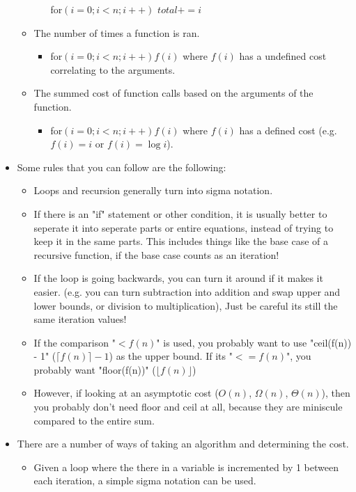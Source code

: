 \documentclass{article}
\begin{document}
\begin{itemize}
\begin{itemize}
\begin{itemize}
                    for$(i = 0; i < n; i++)$ $total += i$
                \end{itemize}
            \item The number of times a function is ran.
                \begin{itemize}
                    \item for$(i = 0; i < n; i++) f(i)$ where $f(i)$ has a undefined cost correlating to the arguments.
                \end{itemize}
            \item The summed cost of function calls based on the arguments of the function.
                \begin{itemize}
                    \item for$(i = 0; i < n; i++) f(i)$ where $f(i)$ has a defined cost (e.g. $f(i) = i$ or $f(i) = \log i$).
                \end{itemize}
		\end{itemize}
	\item Some rules that you can follow are the following:
    	\begin{itemize}
    		\item
				Loops and recursion generally turn into sigma notation.
			\item
				If there is an "if" statement or other condition, it is usually better to seperate it into seperate parts or entire equations, instead of trying to keep it in the same parts. This includes things like the base case of a recursive function, if the base case counts as an iteration!
			\item
				If the loop is going backwards, you can turn it around if it makes it easier. (e.g. you can turn subtraction into addition and swap upper and lower bounds, or division to multiplication), Just be careful its still the same iteration values!
			\item
				If the comparison "$< f(n)$" is used, you probably want to use "ceil(f(n)) - 1" ($\lceil f(n) \rceil - 1$) as the upper bound. If its "$<= f(n)$", you probably want "floor(f(n))" ($\lfloor f(n) \rfloor$)
			\item
				However, if looking at an asymptotic cost ($O(n)$, $\Omega(n)$, $\Theta(n)$), then you probably don't need floor and ceil at all, because they are miniscule compared to the entire sum.
    	\end{itemize}
    \item There are a number of ways of taking an algorithm and determining the cost.
    	\begin{itemize}
    		\item
    			Given a loop where the there in a variable is incremented by 1 between each iteration, a simple sigma notation can be used.
    			

\end{itemize}
\end{itemize}
\end{document}
